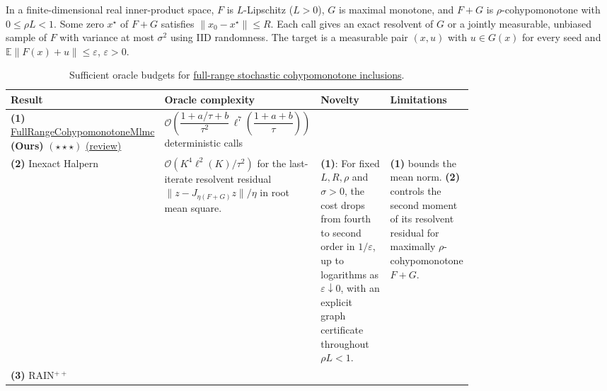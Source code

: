 \begin{table}[tp]
\centering
\caption{Sufficient oracle budgets for \href{https://github.com/k3nfalt/longtails/blob/main/LongTails/Setups/FullRangeCohypomonotoneInclusion.lean}{full-range stochastic cohypomonotone inclusions}.}\label{tab:FullRangeCohypomonotoneInclusion}
\parbox{\linewidth}{\footnotesize In a finite-dimensional real inner-product space, $F$ is $L$-Lipschitz ($L>0$), $G$ is maximal monotone, and $F+G$ is $\rho$-cohypomonotone with $0\le\rho L<1$. Some zero $x^\star$ of $F+G$ satisfies $\|x_0-x^\star\|\le R$. Each call gives an exact resolvent of $G$ or a jointly measurable, unbiased sample of $F$ with variance at most $\sigma^2$ using IID randomness. The target is a measurable pair $(x,u)$ with $u\in G(x)$ for every seed and $\mathbb E\|F(x)+u\|\le\varepsilon$, $\varepsilon>0$.}\par\smallskip
\begin{threeparttable}
\footnotesize
\setlength{\tabcolsep}{4pt}\renewcommand{\arraystretch}{1.25}
\begin{tabularx}{\linewidth}{@{}>{\raggedright\arraybackslash}p{0.20\linewidth}>{\raggedright\arraybackslash}p{0.29\linewidth}>{\raggedright\arraybackslash}p{0.27\linewidth}>{\raggedright\arraybackslash}X@{}}
\toprule
\textbf{Result} & \textbf{Oracle complexity} & \textbf{Novelty} & \textbf{Limitations} \\
\midrule
\textbf{(1)} \href{https://github.com/k3nfalt/longtails/blob/main/LongTails/Theorems/FullRangeCohypomonotoneMlmc.lean}{Full\allowbreak Range\allowbreak Cohypomonotone\allowbreak Mlmc} \textbf{(Ours)} $(\star\star\star)$ \href{https://github.com/k3nfalt/longtails/blob/main/scripts/reviews/FullRangeCohypomonotoneMlmc.md}{(review)}
& $\mathcal{O}\!\left(\dfrac{1+a/\tau+b}{\tau^2}\,\ell^7\!\left(\dfrac{1+a+b}{\tau}\right)\right)$ deterministic calls & & \\
\midrule[1.2pt]
\textbf{(2)} Inexact Halpern \citep[Cor.~4.1]{cohypAKWv3}
& $\mathcal{O}(K^4\ell^2(K)/\tau^2)$ for the last-iterate resolvent residual $\|z-J_{\eta(F+G)}z\|/\eta$ in root mean square.
& \textbf{(1)}: For fixed $L,R,\rho$ and $\sigma>0$, the cost drops from fourth to second order in $1/\varepsilon$, up to logarithms as $\varepsilon\downarrow0$, with an explicit graph certificate throughout $\rho L<1$.
& \textbf{(1)} bounds the mean norm. \textbf{(2)} controls the second moment of its resolvent residual for maximally $\rho$-cohypomonotone $F+G$. \\
\midrule
\textbf{(3)} RAIN$^{++}$ \citep[Thm.~5.4 and Prop.~5.3]{tailChenLuoV4}

\end{tabularx}
\end{threeparttable}
\end{table}
